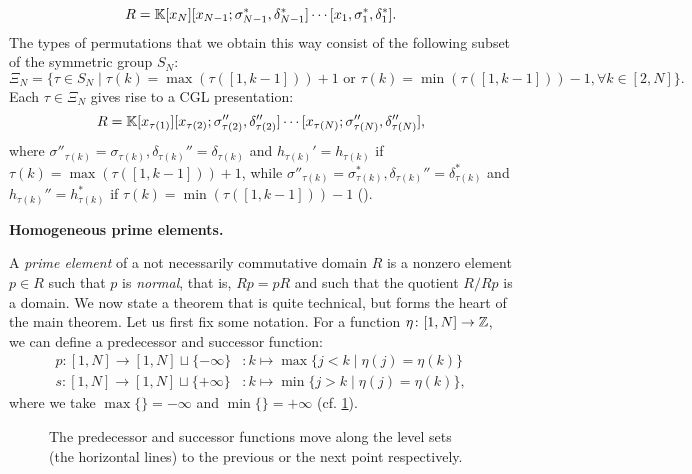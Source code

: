 \documentclass{article}
\begin{document}
\begin{equation*}
	R = \mathbb{K}[x_N][x_{N-1}; \sigma_{N-1}^*, \delta_{N-1}^*]\cdots [x_1, \sigma_1^*, \delta_1^*].
\end{equation*}
%
The types of permutations that we obtain this way consist of the following subset of
the symmetric group $S_N$:
\begin{equation*}
	\Xi_N = \{\tau \in S_N \mid \tau(k) = \max (\tau ([1, k-1])) + 1 \text{ or } \tau(k) = \min (\tau ([1, k-1])) - 1, \forall k \in [2, N]\}.
\end{equation*}
%
Each $\tau \in \Xi_N$ gives rise to a CGL presentation:
\begin{equation*}
	R = \mathbb{K}[x_{\tau(1)}][x_{\tau(2)}; \sigma_{\tau(2)}'', \delta_{\tau(2)}''] \cdots [x_{\tau(N)}; \sigma_{\tau(N)}'', \delta_{\tau(N)}''],
\end{equation*}
%
where $\sigma''_{\tau(k)} = \sigma_{\tau(k)}, \delta_{\tau(k)}'' = \delta_{\tau(k)}$
and $h_{\tau(k)}' = h_{\tau(k)}$ if $\tau(k) = \max(\tau([1,k-1])) + 1$, while
$\sigma''_{\tau(k)} = \sigma^*_{\tau(k)}, \delta_{\tau(k)}'' = \delta^*_{\tau(k)}$ and
$h_{\tau(k)}'' = h_{\tau(k)}^*$ if $\tau(k) = \min(\tau([1,k-1])) - 1$
(\cite[Proposition 3.14]{GoodearlYakimov2017QCA}).

\textbf{Homogeneous prime elements.}

A \emph{prime element} of a not necessarily commutative domain $R$
is a nonzero element $p \in R$ such that $p$ is \emph{normal},
that is, $Rp = pR$ and such that the quotient $R / Rp$ is a domain. We now state a
theorem that is quite technical, but forms the heart of the main theorem. Let us first
fix some notation. For a function $\eta \colon [1, N] \to \mathbb{Z}$, we can define a
predecessor and successor
function:
\begin{align*}
	p \colon [1, N] \to [1, N] \sqcup \{-\infty\} & \colon k \mapsto  \max\{j < k \mid \eta(j) = \eta(k)\}  \\
	s \colon [1, N] \to [1, N] \sqcup \{+\infty\} & \colon k \mapsto  \min\{j > k \mid \eta(j) = \eta(k)\},
\end{align*}
%
where we take $\max \{\} = - \infty$ and $\min \{\}= + \infty$ (cf.
\cref{fig:predecessor_successor}).

\begin{figure}
	\centering
	\caption{The predecessor and successor functions move along the level sets (the horizontal lines) to the previous or the next point respectively.}
	\label{fig:predecessor_successor}
\end{figure}
\end{document}

